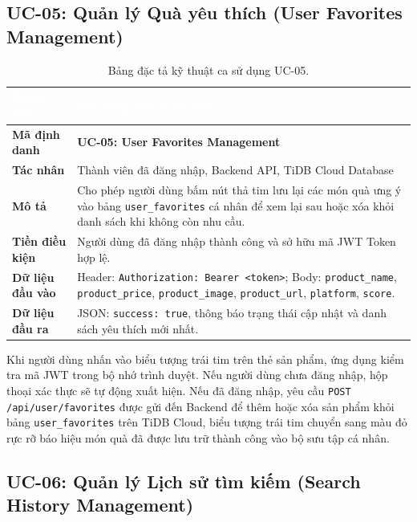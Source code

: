 \subsection{UC-05: Quản lý Quà yêu thích (User Favorites Management)}

\begin{table}[htbp]
\centering
\caption{Bảng đặc tả kỹ thuật ca sử dụng UC-05.}
\label{tab:spec_uc05}
\small
\renewcommand{\arraystretch}{1.2}
\begin{tabularx}{\textwidth}{|p{3.2cm}|X|}
\hline
\rowcolor{PrimaryBlue}
\textcolor{white}{\textbf{Thuộc tính}} & \textcolor{white}{\textbf{Nội dung đặc tả chi tiết}} \\
\hline
\textbf{Mã định danh} & \textbf{UC-05: User Favorites Management} \\
\hline
\textbf{Tác nhân} & Thành viên đã đăng nhập, Backend API, TiDB Cloud Database \\
\hline
\textbf{Mô tả} & Cho phép người dùng bấm nút thả tim lưu lại các món quà ưng ý vào bảng \texttt{user\_favorites} cá nhân để xem lại sau hoặc xóa khỏi danh sách khi không còn nhu cầu. \\
\hline
\textbf{Tiền điều kiện} & Người dùng đã đăng nhập thành công và sở hữu mã JWT Token hợp lệ. \\
\hline
\textbf{Dữ liệu đầu vào} & Header: \texttt{Authorization: Bearer <token>}; Body: \texttt{product\_name}, \texttt{product\_price}, \texttt{product\_image}, \texttt{product\_url}, \texttt{platform}, \texttt{score}. \\
\hline
\textbf{Dữ liệu đầu ra} & JSON: \texttt{success: true}, thông báo trạng thái cập nhật và danh sách yêu thích mới nhất. \\
\hline
\end{tabularx}
\end{table}

Khi người dùng nhấn vào biểu tượng trái tim trên thẻ sản phẩm, ứng dụng kiểm tra mã JWT trong bộ nhớ trình duyệt. Nếu người dùng chưa đăng nhập, hộp thoại xác thực sẽ tự động xuất hiện. Nếu đã đăng nhập, yêu cầu \texttt{POST /api/user/favorites} được gửi đến Backend để thêm hoặc xóa sản phẩm khỏi bảng \texttt{user\_favorites} trên TiDB Cloud, biểu tượng trái tim chuyển sang màu đỏ rực rỡ báo hiệu món quà đã được lưu trữ thành công vào bộ sưu tập cá nhân.

\subsection{UC-06: Quản lý Lịch sử tìm kiếm (Search History Management)}

